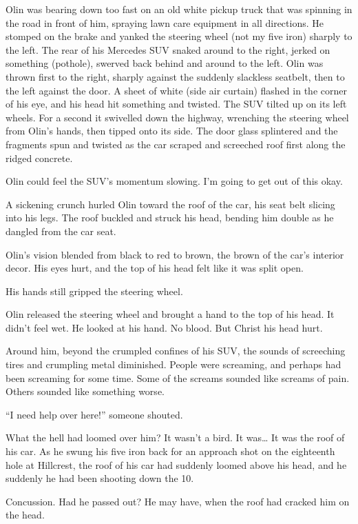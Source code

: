 Olin was bearing down too fast on an old white pickup truck that was spinning in the road in front of him, spraying lawn care equipment in all directions. He stomped on the brake and yanked the steering wheel (not my five iron) sharply to the left. The rear of his Mercedes SUV snaked around to the right, jerked on something (pothole), swerved back behind and around to the left. Olin was thrown first to the right, sharply against the suddenly slackless seatbelt, then to the left against the door. A sheet of white (side air curtain) flashed in the corner of his eye, and his head hit something and twisted. The SUV tilted up on its left wheels. For a second it swivelled down the highway, wrenching the steering wheel from Olin's hands, then tipped onto its side. The door glass splintered and the fragments spun and twisted as the car scraped and screeched roof first along the ridged concrete.

Olin could feel the SUV's momentum slowing. I'm going to get out of this okay.

A sickening crunch hurled Olin toward the roof of the car, his seat belt slicing into his legs. The roof buckled and struck his head, bending him double as he dangled from the car seat.

Olin's vision blended from black to red to brown, the brown of the car's interior decor. His eyes hurt, and the top of his head felt like it was split open.

His hands still gripped the steering wheel.

Olin released the steering wheel and brought a hand to the top of his head. It didn't feel wet. He looked at his hand. No blood. But Christ his head hurt.

Around him, beyond the crumpled confines of his SUV, the sounds of screeching tires and crumpling metal diminished. People were screaming, and perhaps had been screaming for some time. Some of the screams sounded like screams of pain. Others sounded like something worse.

``I need help over here!'' someone shouted.

What the hell had loomed over him? It wasn't a bird. It was… It was the roof of his car. As he swung his five iron back for an approach shot on the eighteenth hole at Hillcrest, the roof of his car had suddenly loomed above his head, and he suddenly he had been shooting down the 10.

Concussion. Had he passed out? He may have, when the roof had cracked him on the head.

